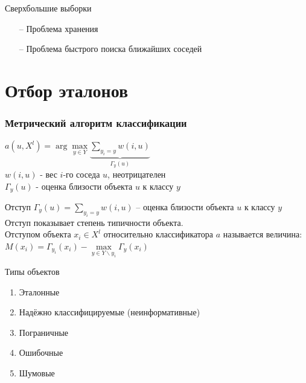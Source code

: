 \documentclass[10pt]{beamer}
\begin{document}
\begin{frame}{Сверхбольшие выборки}
	\begin{itemize} [<+- | alert@+>]
		\item[--] Проблема хранения
		\item[--] Проблема быстрого поиска ближайших соседей
	\end{itemize}
\end{frame}

\section{Отбор эталонов}

\begin{frame}\frametitle{Метрический алгоритм классификации}
	${a(u, X^l) = \arg\max\limits_{y \in Y} \underbrace{\sum\limits_{y_i = y} w(i, u)}_{\Gamma_y(u)} }$\\
	\bigbreak
	$w(i, u)$ - вес $i$-го соседа $u$, неотрицателен\\
	$\Gamma_y(u)$ - оценка близости объекта $u$ к классу ${y}$
\end{frame}

\begin{frame}{Отступ}
	${\Gamma_y(u) = \sum\limits_{y_i = y} w(i, u)}$ -- оценка близости объекта $u$ к классу ${y}$\\
	\bigbreak
	Отступ показывает степень \alert{типичности объекта}.\\
	\bigbreak
	\alert{Отступом} объекта ${x_i \in X^l}$ относительно классификатора $a$ называется величина:\\
	\bigbreak
	\centering	
  ${M(x_i) = \Gamma_{y_i}(x_i) - \max\limits_{y \in Y\backslash y_i} \Gamma_y(x_i)}$

\end{frame}

\begin{frame}{Типы объектов}
	\begin{enumerate} [<+->]
		\item Эталонные
		\item Надёжно классифицируемые (неинформативные)
		\item Пограничные	
		\item Ошибочные	
		\item Шумовые	
	\end{enumerate}
\end{frame}
\end{document}
